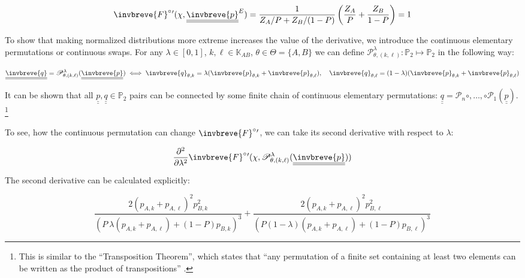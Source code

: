 \documentclass{article}
\theoremstyle{definition}
\begin{document}
\begin{equation}
    \invbreve{F}^\circ{}'(\chi,\underline{\underline{\invbreve{p}}}^E) =
    \frac{1}{Z_A/P+Z_B/(1-P)} 
    \left (
    \frac{Z_A}{P} + \frac{Z_B}{1-P}
    \right ) = 1
\end{equation}

To show that making normalized distributions more extreme increases the value of the derivative, we introduce the continuous elementary permutations or continuous swaps. For any $\lambda \in [0,1]$, $k,\ell \in \mathbb{K}_{AB}$, $\theta \in \Theta = \{A,B\}$ we can define $\mathscr{P}^\lambda_{\theta,(k,\ell)} : \mathbb{P}_2 \mapsto \mathbb{P}_2$ in the following way:

\begin{equation}
    \underline{\underline{\invbreve{q}}} = \mathscr{P}^\lambda_{\theta,(k,\ell)} (\underline{\underline{\invbreve{p}}})
    \iff
    \invbreve{q}_{\theta,k} = \lambda (\invbreve{p}_{\theta,k}+\invbreve{p}_{\theta,\ell}) , \quad
    \invbreve{q}_{\theta,\ell} = (1-\lambda) (\invbreve{p}_{\theta,k}+\invbreve{p}_{\theta,\ell})
\end{equation}

It can be shown that all $\underline{\underline{p}}, \underline{\underline{q}} \in \mathbb{P}_2$ pairs can be connected by some finite chain of continuous elementary permutations: $\underline{\underline{q}} = \mathscr{P}_n \circ,\dots,\circ \mathscr{P}_1 (\underline{\underline{p}})$. \footnote{This is similar to the ``Transposition Theorem'', which states that ``any permutation of a finite set containing at least two
elements can be written as the product of transpositions'' \cite{book:AbstractAlgebra}.}

To see, how the continuous permutation can change $\invbreve{F}^\circ{}'$, we can take its second derivative with respect to $\lambda$:


\begin{equation}
    \frac{\partial^2}{\partial \lambda^2}
    \invbreve{F}^\circ{}'(\chi,\mathscr{P}^\lambda_{\theta,(k,\ell)}(\underline{\underline{\invbreve{p}}}))
\end{equation}

The second derivative can be calculated explicitly:

\begin{equation}
    \frac{2 \left(p_{A,k}+p_{A,\ell}\right)^2 p_ {B,k}^2}{\left(P \
\lambda  \left(p_{A,k}+p_{A,\ell}\right)+(1-P) p_{B,k}\right)^3}+\frac{2 \left(p_{A,k}+p_{A,\ell}\right)^2 p_{B,\ell}^2}{\left(P
(1-\lambda ) \left(p_{A,k}+p_{A,\ell}\right)+(1-P) p_{B,\ell}\right)^3}
\end{equation}
\end{document}
